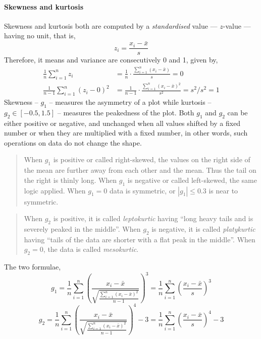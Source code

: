 \paragraph{Skewness and kurtosis}
    Skewness and kurtosis both are computed by a \emph{standardised} value --- $z$-value --- having no unit, that is,
    \begin{equation}
        z_i=\frac{x_i-\bar{x}}{s}  
    \end{equation}
    Therefore, it means and variance are consecutively 0 and 1, given by,
    \begin{equation}
        \begin{aligned}
            \frac{1}{n} \sum_{i=1}^{n} z_i &= \frac{1}{n}\cdot\frac{\sum_{i=1}^{n} (x_i - \bar{x})}{s} = 0 \\[6pt]
            \frac{1}{n-1} \sum_{i=1}^{n} (z_i - 0)^2 
            &= \frac{1}{n-1}\cdot\frac{\sum_{i=1}^{n} (x_i - \bar{x})^2}{s^2} = s^2/s^2 = 1
        \end{aligned}
    \end{equation}
    Skewness -- $g_1$ -- measures the asymmetry of a plot while kurtosis -- $g_2\in[-0.5, 1.5]$ -- measures the peakedness of the plot. Both $g_1$ and $g_2$ can be either positive or negative, and unchanged 
    when all values shifted by a fixed number or when they are multiplied with a fixed number, in other words, such operations on data do not change the shape. 
    \begin{quote}
        When $g_1$ is positive or called right-skewed, the values on the right side of the mean are further away from each other and the mean. Thus the tail on the right is thinly long. When $g_1$ is negative or called 
        left-skewed, the same logic applied. When $g_1=0$ data is symmetric, or $|g_1|\leq0.3$ is near to symmetric.
    \end{quote}
    \begin{quote}
        When $g_2$ is positive, it is called \emph{leptokurtic} having ``long heavy tails and is severely peaked in the middle''. When $g_2$ is negative, it is called \emph{platykurtic} having ``tails of 
        the data are shorter with a flat peak in the middle''. When $g_2=0$, the data is called \emph{mesokurtic}.
    \end{quote}
    The two formulae,
    \begin{equation}
        g_1 = \frac{1}{n} \sum_{i=1}^{n} \left( \frac{x_i - \bar{x}}{\sqrt{\frac{\sum_{i=1}^{n}(x_i-\bar{x})^2}{n-1}}} \right)^3 =\frac{1}{n} \sum_{i=1}^{n} \left( \frac{x_i - \bar{x}}{s} \right)^3 
    \end{equation}
    \begin{equation}\label{eq:KurtosisEquation}
        g_2 = \frac{1}{n} \sum_{i=1}^{n} \left( \frac{x_i - \bar{x}}{\sqrt{\frac{\sum_{i=1}^{n}(x_i-\bar{x})^2}{n-1}}} \right)^4 - 3 = \frac{1}{n} \sum_{i=1}^{n} \left( \frac{x_i - \bar{x}}{s} \right)^4 - 3
    \end{equation}
